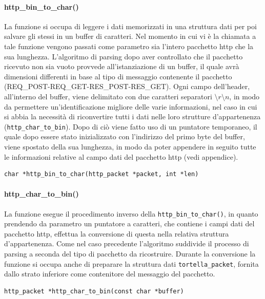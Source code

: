 \paragraph{http\_bin\_to\_char()}
La funzione si occupa di leggere i dati memorizzati in una struttura dati per poi salvare gli stessi in un buffer di caratteri. Nel momento in cui vi è la chiamata a tale funzione vengono passati come parametro sia l'intero pacchetto http che la sua lunghezza. L'algoritmo di parsing dopo aver controllato che il pacchetto ricevuto non sia vuoto provvede all'istanziazione di un buffer, il quale avrà dimensioni differenti  in base al tipo di messaggio contenente il pacchetto (REQ\_POST-REQ\_GET-RES\_POST-RES\_GET). Ogni campo dell'header, all'interno del buffer, viene delimitato con due caratteri separatori \texttt{$\setminus r\setminus n$}, in modo da permettere un'identificazione migliore delle varie informazioni, nel caso in cui si abbia la necessità di riconvertire tutti i dati nelle loro strutture d'appartenenza (\texttt{http\_char\_to\_bin}). Dopo di ciò viene fatto uso di un puntatore temporaneo, il quale dopo essere stato inizializzato con l'indirizzo del primo byte del buffer, viene spostato della sua lunghezza, in modo da poter appendere in seguito tutte le informazioni relative al campo dati del pacchetto http (vedi appendice).
\begin{lstlisting}
char *http_bin_to_char(http_packet *packet, int *len)
\end{lstlisting}
\paragraph{http\_char\_to\_bin()}
La funzione esegue il procedimento inverso della \texttt{http\_bin\_to\_char()}, in quanto prendendo da parametro un puntatore a caratteri, che contiene i campi dati del pacchetto http, effettua la conversione di questa nella relativa struttura d'appartenenza. Come nel caso precedente l'algoritmo suddivide il processo di parsing a seconda del tipo di pacchetto da ricostruire. Durante la conversione la funzione si occupa anche di preparare la struttura dati \texttt{tortella\_packet}, fornita dallo strato inferiore come contenitore del messaggio del pacchetto.
\begin{lstlisting}
http_packet *http_char_to_bin(const char *buffer)
\end{lstlisting}
